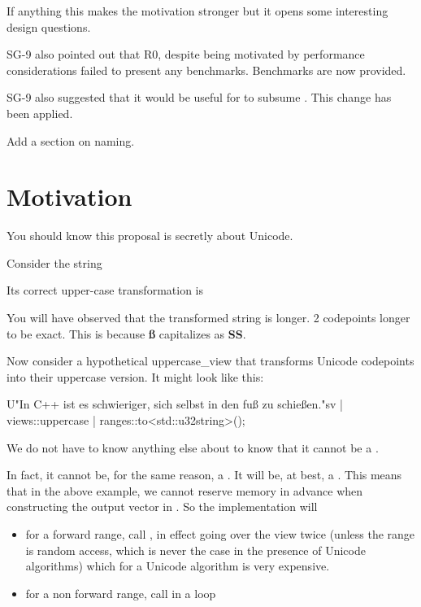 \documentclass{wg21}
\begin{document}
If anything this makes the motivation stronger but it opens some interesting design questions.

SG-9 also pointed out that R0, despite being motivated by performance considerations failed to present any benchmarks. Benchmarks are now provided.

SG-9 also suggested that it would be useful for  to subsume .
This change has been applied.

Add a section on naming.

\section{Motivation}

You should know this proposal is secretly about Unicode.

Consider the string


Its correct upper-case transformation is


You will have observed that the transformed string is longer.
2 codepoints longer to be exact. This is because \textbf{ß} capitalizes as \textbf{SS}.

Now consider a hypothetical uppercase_view that transforms Unicode codepoints into their uppercase version.
It might look like this:

\begin{colorblock}
U"In C++ ist es schwieriger, sich selbst in den fuß zu schießen."sv
    | views::uppercase
    | ranges::to<std::u32string>();
\end{colorblock}

We do not have to know anything else about  to know that it cannot be a .

In fact, it cannot be, for the same reason, a .  It will be, at best, a .
This means that in the above example, we cannot reserve memory in advance when constructing the output vector in .
So the implementation will
\begin{itemize}
\item for a forward range, call , in effect going over the view twice (unless the range is random access, which is never the case in the presence of Unicode algorithms) which for a Unicode algorithm is very expensive.
\item for a non forward range, call  in a loop
\end{itemize}
\end{document}
